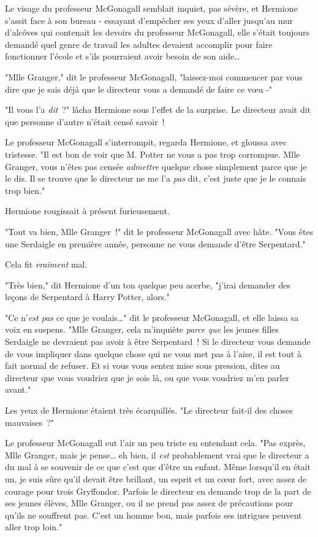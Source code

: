 Le visage du professeur McGonagall semblait inquiet, pas sévère, et Hermione s'assit face à son bureau - essayant d'empêcher ses yeux d'aller jusqu'au mur d'alcôves qui contenait les devoirs du professeur McGonagall, elle s'était toujours demandé quel genre de travail les adultes devaient accomplir pour faire fonctionner l'école et s'ils pourraient avoir besoin de son aide…

"Mlle Granger," dit le professeur McGonagall, "laissez-moi commencer par vous dire que je sais déjà que le directeur vous a demandé de faire ce vœu -"

"Il vous l'a \emph{dit}~?" lâcha Hermione sous l'effet de la surprise. Le directeur avait dit que personne d'autre n'était censé savoir~!

Le professeur McGonagall s'interrompit, regarda Hermione, et gloussa avec tristesse. "Il est bon de voir que M. Potter ne vous a pas trop corrompue. Mlle Granger, vous n'êtes pas censée \emph{admettre} quelque chose simplement parce que je le dis. Il se trouve que le directeur ne me l'a \emph{pas} dit, c'est juste que je le connais trop bien."

Hermione rougissait à présent furieusement.

"Tout va bien, Mlle Granger~!" dit le professeur McGonagall avec hâte. "Vous êtes une Serdaigle en première année, personne ne vous demande d'être Serpentard."

Cela fit \emph{vraiment} mal.

"Très bien," dit Hermione d'un ton quelque peu acerbe, "j'irai demander des leçons de Serpentard à Harry Potter, alors."

"Ce n'\emph{est pas} ce que je voulais…" dit le professeur McGonagall, et elle laissa sa voix en suspens. "Mlle Granger, cela m'inquiète \emph{parce que} les jeunes filles Serdaigle ne devraient pas avoir à être Serpentard~! Si le directeur vous demande de vous impliquer dans quelque chose qui ne vous met pas à l'aise, il est tout à fait normal de refuser. Et si vous vous sentez mise sous pression, dites au directeur que vous voudriez que je sois là, ou que vous voudriez m'en parler avant."

Les yeux de Hermione étaient très écarquillés. "Le directeur fait-il des choses mauvaises~?"

Le professeur McGonagall eut l'air un peu triste en entendant cela. "Pas exprès, Mlle Granger, mais je pense… eh bien, il \emph{est} probablement vrai que le directeur a du mal à se souvenir de ce que c'est que d'être un enfant. Même lorsqu'il en était un, je suis sûre qu'il devait être brillant, un esprit et un cœur fort, avec assez de courage pour trois Gryffondor. Parfois le directeur en demande trop de la part de ses jeunes élèves, Mlle Granger, ou il ne prend pas assez de précautions pour qu'ils ne souffrent pas. C'est un homme bon, mais parfois ses intrigues peuvent aller trop loin."

